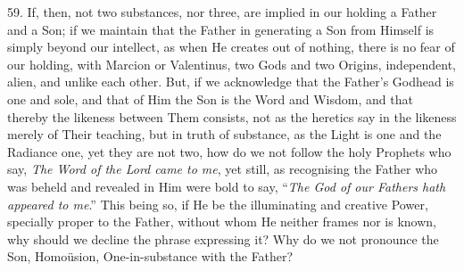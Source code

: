 59. If, then, not two
substances, nor three, are implied in our holding a Father and a Son;
if we maintain that the Father in generating a Son from Himself is
simply beyond our intellect, as when He creates out of nothing, there
is no fear of our holding, with Marcion or Valentinus, two Gods and two
Origins, independent, alien, and unlike each other. But, if we
acknowledge that the Father's Godhead is one and sole, and that of Him
the Son is the Word and Wisdom, and that thereby the likeness between
Them consists, not as the heretics say in the likeness merely of Their
teaching, but in truth of substance, as the Light is one and the
Radiance one, yet they are not two, how do we not follow the
holy Prophets who say, \emph{The Word of the Lord came to me}, yet
still, as recognising the Father who was beheld and revealed in Him
were bold to say, ``\emph{The God of our Fathers hath appeared to me}.''
This being so, if He be the illuminating and creative Power, specially
proper to the Father, without whom He neither frames nor is known, why
should we decline the phrase expressing it? Why do we not pronounce
the Son, Homoüsion, One-in-substance with the Father?

